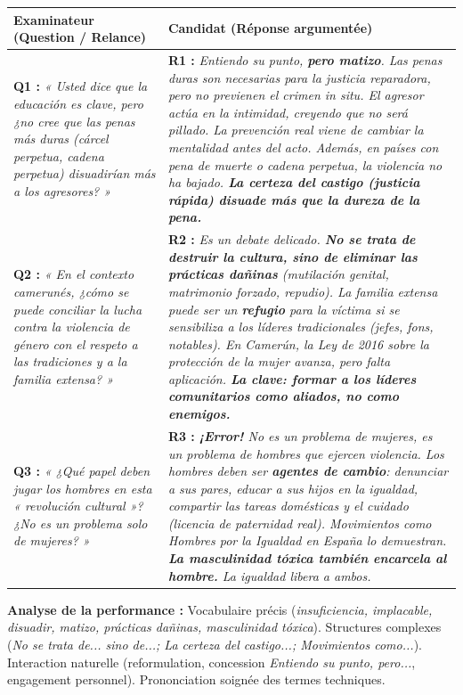 \documentclass[11pt]{article}
\newcommand{\esp}[1]{\ifmmode\text{\textit{#1}}\else\begingroup\selectlanguage{spanish}\itshape #1\endgroup\fi}
\begin{document}
\begin{exoresolu}
\begin{center}
\begin{tabularx}{\linewidth}{|X|X|}\hline
\rowcolor{popblueL} \textbf{Examinateur (Question / Relance)} & \textbf{Candidat (Réponse argumentée)} \\ \hline
\textbf{Q1 :} \esp{« Usted dice que la educación es clave, pero ¿no cree que las penas más duras (cárcel perpetua, cadena perpetua) disuadirían más a los agresores? »} & \textbf{R1 :} \esp{Entiendo su punto, \textbf{pero matizo}. Las penas duras son necesarias para la justicia reparadora, pero no previenen el crimen \emph{in situ}. El agresor actúa en la intimidad, creyendo que no será pillado. La prevención real viene de cambiar la mentalidad \emph{antes} del acto. Además, en países con pena de muerte o cadena perpetua, la violencia no ha bajado. \textbf{La certeza del castigo (justicia rápida) disuade más que la dureza de la pena.}} \\ \hline
\textbf{Q2 :} \esp{« En el contexto camerunés, ¿cómo se puede conciliar la lucha contra la violencia de género con el respeto a las tradiciones y a la familia extensa? »} & \textbf{R2 :} \esp{Es un debate delicado. \textbf{No se trata de destruir la cultura, sino de eliminar las prácticas dañinas} (mutilación genital, matrimonio forzado, repudio). La familia extensa puede ser un \textbf{refugio} para la víctima si se sensibiliza a los líderes tradicionales (jefes, \emph{fons}, notables). En Camerún, la \emph{Ley de 2016 sobre la protección de la mujer} avanza, pero falta aplicación. \textbf{La clave: formar a los líderes comunitarios como aliados, no como enemigos.}} \\ \hline
\textbf{Q3 :} \esp{« ¿Qué papel deben jugar los hombres en esta « revolución cultural »? ¿No es un problema solo de mujeres? »} & \textbf{R3 :} \esp{\textbf{¡Error!} No es un problema de mujeres, es un problema de hombres que ejercen violencia. Los hombres deben ser \textbf{agentes de cambio}: denunciar a sus pares, educar a sus hijos en la igualdad, compartir las tareas domésticas y el cuidado (licencia de paternidad real). Movimientos como \emph{Hombres por la Igualdad} en España lo demuestran. \textbf{La masculinidad tóxica también encarcela al hombre.} La igualdad libera a ambos.} \\ \hline
\end{tabularx}
\end{center}

\textbf{Analyse de la performance :} Vocabulaire précis (\emph{insuficiencia, implacable, disuadir, matizo, prácticas dañinas, masculinidad tóxica}). Structures complexes (\emph{No se trata de... sino de...; La certeza del castigo...; Movimientos como...}). Interaction naturelle (reformulation, concession \emph{Entiendo su punto, pero...}, engagement personnel). Prononciation soignée des termes techniques.
\end{exoresolu}
\end{document}

